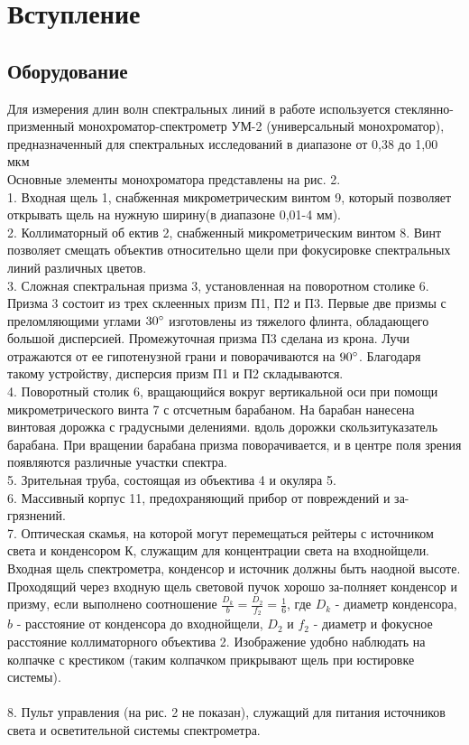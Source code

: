 \documentclass[14pt, a4paper]{extarticle}
\begin{document}
\section{Вступление}
\subsection{Оборудование} %
\label{sec:оборудование}
		
Для измерения длин волн спектральных линий в работе используется стеклянно-призменный монохроматор-спектрометр УМ-2 (универсальный монохроматор), предназначенный для спектральных исследований в диапазоне от 0,38 до 1,00 мкм\\
Основные элементы монохроматора представлены на рис. 2. \\
1. Входная щель 1, снабженная микрометрическим винтом 9, который позволяет открывать щель на нужную ширину(в диапазоне 0,01-4 мм).\\ 2. Коллиматорный об ектив 2, снабженный микрометрическим винтом 8. Винт позволяет смещать объектив относительно щели при фокусировке спектральных линий различных цветов.\\
3. Сложная спектральная призма 3, установленная на поворотном столике 6. Призма 3 состоит из трех склеенных призм П1, П2 и П3. Первые две призмы с преломляющими углами $30\degree$ изготовлены из тяжелого флинта, обладающего большой дисперсией. Промежуточная призма П3 сделана из крона. Лучи отражаются от ее гипотенузной грани и поворачиваются на $90\degree$. Благодаря такому устройству, дисперсия призм П1 и П2 складываются. 
\\ 4. Поворотный столик 6, вращающийся вокруг вертикальной оси при помощи микрометрического винта 7 с отсчетным барабаном. На барабан нанесена винтовая дорожка с градусными делениями. вдоль дорожки скользитуказатель барабана. При вращении барабана призма поворачивается, и в центре поля зрения появляются различные участки спектра. 
\\5.  Зрительная труба, состоящая из объектива 4 и окуляра 5. 
\\
6. Массивный корпус 11, предохраняющий прибор от повреждений и за-грязнений.
\\7. Оптическая скамья, на которой могут перемещаться рейтеры с источником света и конденсором К, служащим для концентрации света на входнойщели. Входная щель спектрометра, конденсор и источник должны быть наодной высоте. Проходящий через входную щель световой пучок хорошо за-полняет конденсор и призму, если выполнено соотношение $\frac{D_k}{b} = \frac{D_2}{f_2} = \frac{1}{6}$, где $D_k$ - диаметр конденсора, $b$ - расстояние от конденсора до входнойщели, $D_2$ и $f_2$ - диаметр и фокусное расстояние коллиматорного объектива 2. Изображение удобно наблюдать на колпачке с крестиком (таким колпачком прикрывают щель при юстировке системы).\\ 
\\8. Пульт управления (на рис. 2 не показан), служащий для питания источников света и осветительной системы спектрометра.
\end{document}
